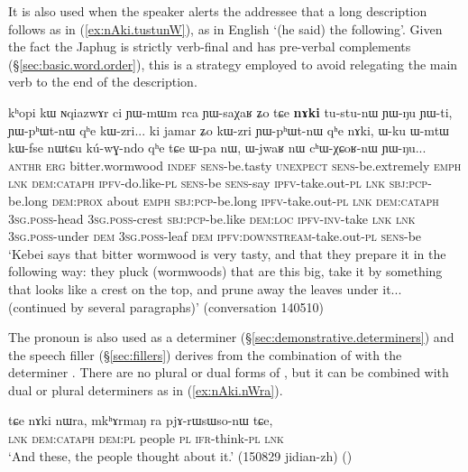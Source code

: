 It is also used  when the speaker alerts the addressee that a long description follows as in (\ref{ex:nAki.tustunW}), as in English `(he said) the following'. Given the fact the Japhug is strictly verb-final and has pre-verbal complements (§\ref{sec:basic.word.order}), this is a strategy employed to avoid relegating the main verb to the end of the description.

 \begin{exe}
\ex \label{ex:nAki.tustunW}
 \gll kʰopi kɯ ɴqiazwɤr ci ɲɯ-mɯm rca ɲɯ-saχaʁ ʑo tɕe \textbf{nɤki} tu-stu-nɯ ɲɯ-ŋu ɲɯ-ti, ɲɯ-pʰɯt-nɯ qʰe kɯ-zri... ki jamar ʑo kɯ-zri ɲɯ-pʰɯt-nɯ qʰe nɤki, ɯ-ku ɯ-mtɯ kɯ-fse nɯtɕu kú-wɣ-ndo qʰe tɕe ɯ-pa nɯ, ɯ-jwaʁ nɯ cʰɯ-χɕoʁ-nɯ ɲɯ-ŋu...  \\
\textsc{anthr} \textsc{erg} bitter.wormwood \textsc{indef} \textsc{sens}-be.tasty \textsc{unexpect} \textsc{sens}-be.extremely \textsc{emph} \textsc{lnk} \textsc{dem}:\textsc{cataph} \textsc{ipfv}-do.like-\textsc{pl} \textsc{sens}-be \textsc{sens}-say \textsc{ipfv}-take.out-\textsc{pl} \textsc{lnk} \textsc{sbj}:\textsc{pcp}-be.long \textsc{dem}:\textsc{prox} about \textsc{emph} \textsc{sbj}:\textsc{pcp}-be.long \textsc{ipfv}-take.out-\textsc{pl} \textsc{lnk} \textsc{dem}:\textsc{cataph} \textsc{3sg}.\textsc{poss}-head  \textsc{3sg}.\textsc{poss}-crest \textsc{sbj}:\textsc{pcp}-be.like  \textsc{dem}:\textsc{loc} \textsc{ipfv}-\textsc{inv}-take \textsc{lnk} \textsc{lnk} \textsc{3sg}.\textsc{poss}-under \textsc{dem}  \textsc{3sg}.\textsc{poss}-leaf \textsc{dem} \textsc{ipfv}:\textsc{downstream}-take.out-\textsc{pl}  \textsc{sens}-be \\
\glt `Kebei says that bitter wormwood is very tasty, and that they prepare it in the following way: they pluck (wormwoods) that are this big, take it by something that looks like a crest on the top, and prune away the leaves under it... (continued by several paragraphs)' (conversation 140510)
\end{exe}

The pronoun  is also used as a determiner (§\ref{sec:demonstrative.determiners}) and the speech filler  (§\ref{sec:fillers}) derives from the combination of    with the determiner . There are no plural or dual forms of , but it can be combined with dual or plural determiners as in (\ref{ex:nAki.nWra}).

\begin{exe}
\ex \label{ex:nAki.nWra}
\gll  tɕe nɤki nɯra, mkʰɤrmaŋ ra pjɤ-rɯsɯso-nɯ tɕe, \\
\textsc{lnk} \textsc{dem}:\textsc{cataph} \textsc{dem}:\textsc{pl} people \textsc{pl} \textsc{ifr}-think-\textsc{pl} \textsc{lnk} \\
\glt `And these, the people thought about it.' (150829 jidian-zh)
()
\end{exe}

